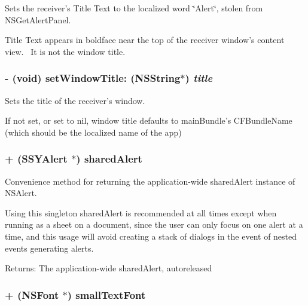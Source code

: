 Sets the receiver's Title Text to the localized word \char`\"{}Alert\char`\"{}, stolen from NSGetAlertPanel. 

Title Text appears in boldface near the top of the receiver window's content view.~ It is not the window title. \hypertarget{interface_s_s_y_alert_6e1c01e863e79182a929fa7678fb6fd9}{
\subsubsection[{setWindowTitle:}]{\setlength{\rightskip}{0pt plus 5cm}- (void) setWindowTitle: (NSString$\ast$) {\em title}}}
\label{interface_s_s_y_alert_6e1c01e863e79182a929fa7678fb6fd9}


Sets the title of the receiver's window. 

If not set, or set to nil, window title defaults to mainBundle's CFBundleName (which should be the localized name of the app) \hypertarget{interface_s_s_y_alert_d81f6d234a6bbe8a7181c739f0b6ef2e}{
\subsubsection[{sharedAlert}]{\setlength{\rightskip}{0pt plus 5cm}+ ({\bf SSYAlert} $\ast$) sharedAlert }}
\label{interface_s_s_y_alert_d81f6d234a6bbe8a7181c739f0b6ef2e}


Convenience method for returning the application-wide sharedAlert instance of NSAlert. 

Using this singleton sharedAlert is recommended at all times except when running as a sheet on a document, since the user can only focus on one alert at a time, and this usage will avoid creating a stack of dialogs in the event of nested events generating alerts. \begin{Desc}
\item[Returns:]The application-wide sharedAlert, autoreleased \end{Desc}
\hypertarget{interface_s_s_y_alert_7235377dad1e98bade605b665770f056}{
\subsubsection[{smallTextFont}]{\setlength{\rightskip}{0pt plus 5cm}+ (NSFont $\ast$) smallTextFont }}
\label{interface_s_s_y_alert_7235377dad1e98bade605b665770f056}


